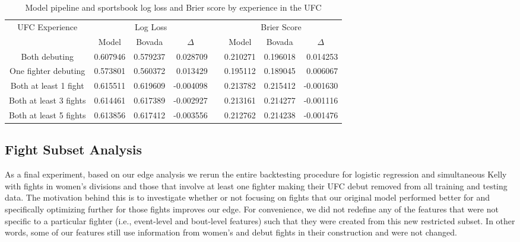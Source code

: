 \documentclass[12pt,twoside]{report}
\begin{document}
\begin{table}[!htb]
\centering
\begin{tabular}{@{}cccrcccr@{}}
\toprule
\multirow{2}{*}{UFC Experience} & \multicolumn{3}{c}{Log Loss}                       & \multirow{2}{*}{}    & \multicolumn{3}{c}{Brier Score}                    \\ \cmidrule(lr){2-4} \cmidrule(l){6-8} 
                                & Model    & Bovada   & \multicolumn{1}{c}{$\Delta$} &                      & Model    & Bovada   & \multicolumn{1}{c}{$\Delta$} \\ \midrule
Both debuting                   & 0.607946 & 0.579237 & 0.028709                     &                      & 0.210271 & 0.196018 & 0.014253                     \\
One fighter debuting            & 0.573801 & 0.560372 & 0.013429                    & \multicolumn{1}{l}{} & 0.195112 & 0.189045 & 0.006067                     \\
Both at least 1 fight           & 0.615511 & 0.619609 & -0.004098                    & \multicolumn{1}{l}{} & 0.213782 & 0.215412 & -0.001630                    \\
Both at least 3 fights          & 0.614461 & 0.617389 & -0.002927                    & \multicolumn{1}{l}{} & 0.213161 & 0.214277 & -0.001116                    \\
Both at least 5 fights          & 0.613856 & 0.617412 & -0.003556                    &                      & 0.212762 & 0.214238 & -0.001476                   \\ \bottomrule
\end{tabular}
\caption{Model pipeline and sportsbook log loss and Brier score by experience in the UFC}
\end{table}


\subsection{Fight Subset Analysis}

As a final experiment, based on our edge analysis we rerun the entire backtesting procedure for logistic regression and simultaneous Kelly with fights in women's divisions and those that involve at least one fighter making their UFC debut removed from all training and testing data. The motivation behind this is to investigate whether or not focusing on fights that our original model performed better for and specifically optimizing further for those fights improves our edge. For convenience, we did not redefine any of the features that were not specific to a particular fighter (i.e., event-level and bout-level features) such that they were created from this new restricted subset. In other words, some of our features still use information from women's and debut fights in their construction and were not changed.
\end{document}
